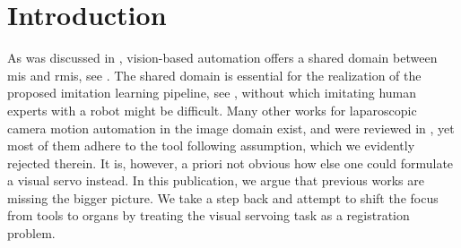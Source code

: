 


\section{Introduction}
\label{c2:sec:introduction}
As was discussed in , vision-based automation offers a shared domain between \acrshort{mis} and \acrshort{rmis}, see . The shared domain is essential for the realization of the proposed imitation learning pipeline, see , without which imitating human experts with a robot might be difficult. Many other works for laparoscopic camera motion automation in the image domain exist, and were reviewed in , yet most of them adhere to the tool following assumption, which we evidently rejected therein. It is, however, a priori not obvious how else one could formulate a visual servo instead. In this publication, we argue that previous works are missing the bigger picture. We take a step back and attempt to shift the focus from tools to organs by treating the visual servoing task as a registration problem.

